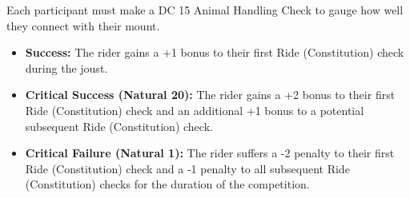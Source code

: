 {\entryfont Each participant must make a DC 15 Animal Handling Check to gauge how well they connect with their mount.
\begin{itemize}
	\renewcommand\labelitemi{\textbf{\textbullet}}
	\item \textbf{Success:} The rider gains a +1 bonus to their first Ride (Constitution) check during the joust.
	\item \textbf{Critical Success (Natural 20):} The rider gains a +2 bonus to their first Ride (Constitution) check and an additional +1 bonus to a potential subsequent Ride (Constitution) check.
	\item \textbf{Critical Failure (Natural 1):} The rider suffers a -2 penalty to their first Ride (Constitution) check and a -1 penalty to all subsequent Ride (Constitution) checks for the duration of the competition.
\end{itemize}}
